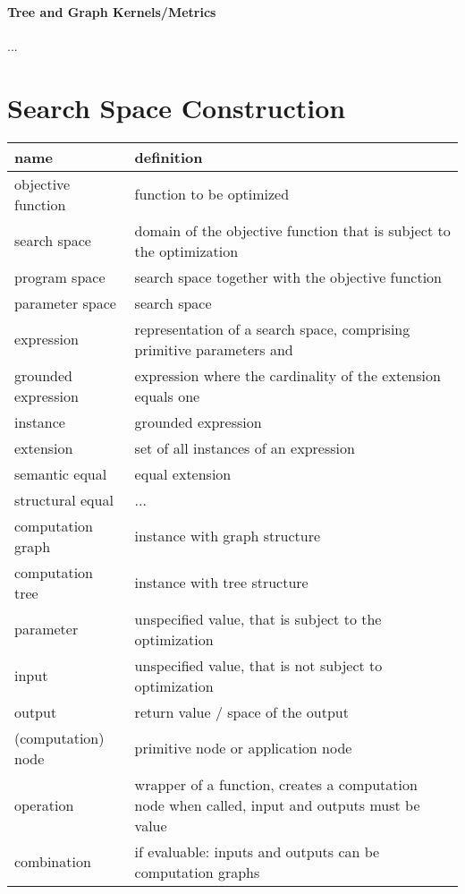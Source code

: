 \documentclass[english]{article}
\begin{document}
\paragraph{Tree and Graph Kernels/Metrics}
...



\section{Search Space Construction}


\begin{table}
  \begin{tabular}{| l | l |}
    \hline
    name & definition \\
    \hline \hline
    objective function & function to be optimized \\
    search space &  domain of the objective function that is subject to the optimization\\
    program space & search space together with the objective function \\
    parameter space & search space \\
    expression & representation of a search space, comprising primitive parameters and \\
    grounded expression & expression where the cardinality of the extension equals one \\
    instance & grounded expression \\
    extension & set of all instances of an expression \\
    semantic equal & equal extension \\
    structural equal & ... \\
    computation graph & instance with graph structure \\
    computation tree & instance with tree structure \\
    parameter & unspecified value, that is subject to the optimization \\
    input & unspecified value, that is not subject to optimization \\
    output & return value / space of the output \\
    (computation) node & primitive node or application node \\
    operation & wrapper of a function, creates a computation node when called, input and outputs must be value \\
    combination & if evaluable: inputs and outputs can be computation graphs \\

\end{tabular}
\end{table}
\end{document}
